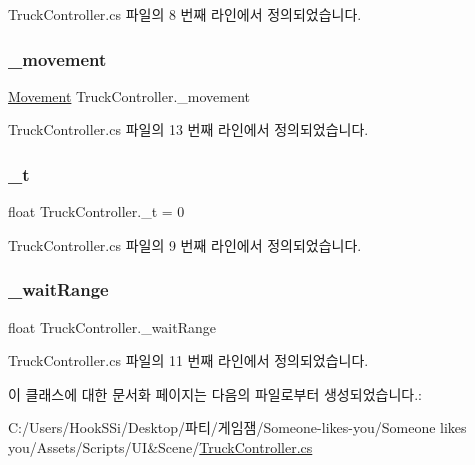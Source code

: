 Truck\+Controller.\+cs 파일의 8 번째 라인에서 정의되었습니다.

\mbox{\label{class_truck_controller_a7203e966d38b303e9156e10e4167197e}} 
\subsubsection{\texorpdfstring{\_movement}{\_movement}}
{\footnotesize\ttfamily \mbox{\hyperlink{class_movement}{Movement}} Truck\+Controller.\+\_\+movement\hspace{0.3cm}{\ttfamily [private]}}



Truck\+Controller.\+cs 파일의 13 번째 라인에서 정의되었습니다.

\mbox{\label{class_truck_controller_a0d7eb82e03d2f76581072996494b720a}} 
\subsubsection{\texorpdfstring{\_t}{\_t}}
{\footnotesize\ttfamily float Truck\+Controller.\+\_\+t = 0\hspace{0.3cm}{\ttfamily [private]}}



Truck\+Controller.\+cs 파일의 9 번째 라인에서 정의되었습니다.

\mbox{\label{class_truck_controller_a796611411cda1af4b4f01ca3543b2d5e}} 
\subsubsection{\texorpdfstring{\_waitRange}{\_waitRange}}
{\footnotesize\ttfamily float Truck\+Controller.\+\_\+wait\+Range}



Truck\+Controller.\+cs 파일의 11 번째 라인에서 정의되었습니다.



이 클래스에 대한 문서화 페이지는 다음의 파일로부터 생성되었습니다.\+:\begin{DoxyCompactItemize}
\item 
C\+:/\+Users/\+Hook\+S\+Si/\+Desktop/파티/게임잼/\+Someone-\/likes-\/you/\+Someone likes you/\+Assets/\+Scripts/\+U\+I\&\+Scene/\mbox{\hyperlink{_truck_controller_8cs}{Truck\+Controller.\+cs}}\end{DoxyCompactItemize}
